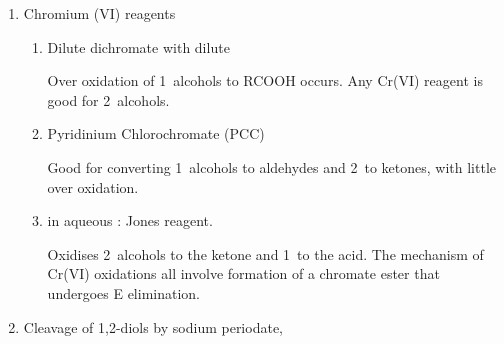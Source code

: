 \begin{enumerate}[label=\alph*)]

	\item Chromium (VI) reagents

		\begin{enumerate}[label=\roman*)]

			\item Dilute dichromate with dilute 


				Over oxidation of 1\de\ alcohols to RCOOH occurs. Any Cr(VI) reagent
				is good for 2\de\ alcohols.

			\item Pyridinium Chlorochromate (PCC)

				Good for converting 1\de\ alcohols to aldehydes and 2\de\ to ketones,
				with little over oxidation.


			\item {} in aqueous : Jones reagent.

				Oxidises 2\de\ alcohols to the ketone and 1\de\ to the acid. The
				mechanism of Cr(VI) oxidations all involve formation of a
				chromate ester that undergoes E elimination.


		\end{enumerate}

	\item Cleavage of 1,2-diols by sodium periodate, 

\end{enumerate}


